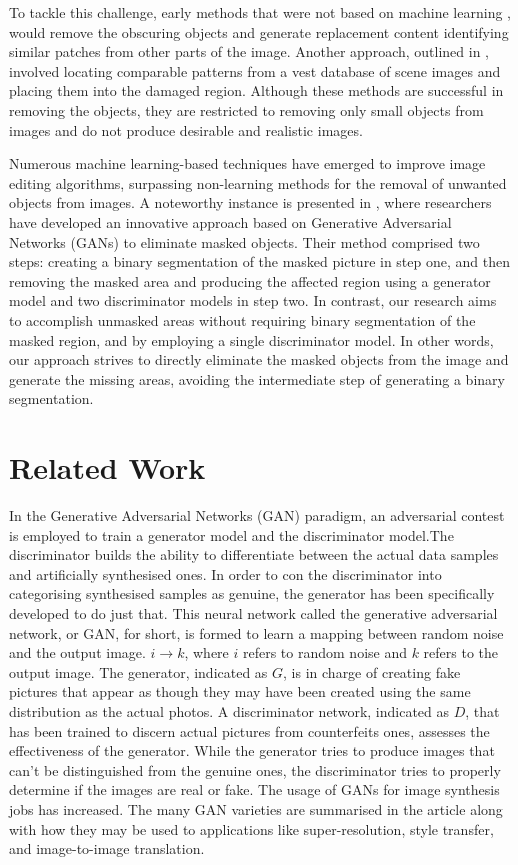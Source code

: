 \documentclass{./styles/svproc}
\begin{document}
To tackle this challenge, early methods that were not based on machine learning \cite{1323101}, \cite{Darabi2012} would remove the obscuring objects and generate replacement content identifying similar patches from other parts of the image. Another approach, outlined in \cite{Hays:2007}, involved locating comparable patterns from a vest database of scene images and placing them into the damaged region. Although these methods are successful in removing the objects, they are restricted to removing only small objects from images and do not produce desirable and realistic images.

Numerous machine learning-based techniques have emerged to improve image editing algorithms, surpassing non-learning methods for the removal of unwanted objects from images. A noteworthy instance is presented in \cite{article0}, where researchers have developed an innovative approach based on Generative Adversarial Networks (GANs) to eliminate masked objects. Their method comprised two steps: creating a binary segmentation of the masked picture in step one, and then removing the masked area and producing the affected region using a generator model and two discriminator models in step two. In contrast, our research aims to accomplish unmasked areas without requiring binary segmentation of the masked region, and by employing a single discriminator model. In other words, our approach strives to directly eliminate the masked objects from the image and generate the missing areas, avoiding the intermediate step of generating a binary segmentation.

\section{Related Work}
In the Generative Adversarial Networks (GAN) \cite{goodfellow2014generative} paradigm, an adversarial contest is employed to train a generator model and the discriminator model.The discriminator builds the ability to differentiate between the actual data samples and artificially synthesised ones. In order to con the discriminator into categorising synthesised samples as genuine, the generator has been specifically developed to do just that. This neural network called the generative adversarial network, or GAN, for short, is formed to learn a mapping between random noise and the output image. $i \rightarrow k$,  where $i$ refers to random noise and $k$ refers to the output image. The generator, indicated as $G$, is in charge of creating fake pictures that appear as though they may have been created using the same distribution as the actual photos. A discriminator network, indicated as $D$, that has been trained to discern actual pictures from counterfeits ones, assesses the effectiveness of the generator. While the generator tries to produce images that can't be distinguished from the genuine ones, the discriminator tries to properly determine if the images are real or fake. The usage of GANs for image synthesis jobs has increased. The many GAN varieties are summarised in the article \cite{8195348} along with how they may be used to applications like super-resolution, style transfer, and image-to-image translation.
\end{document}
